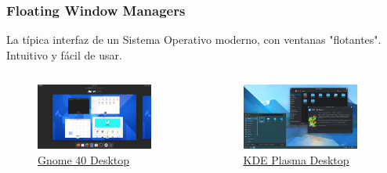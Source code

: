 \documentclass[aspectratio=43]{beamer}
\begin{document}
\begin{frame}
    \frametitle{Floating Window Managers}
    La típica interfaz de un Sistema Operativo moderno, con ventanas "flotantes". Intuitivo y fácil de usar.\newline

    \begin{columns}[c]
        \begin{column}{0.5\textwidth}
            \begin{figure}
                \centering
                \includegraphics[width=0.9\textwidth]{img/gnome-desktop.jpg}
                \caption{\href{https://forty.gnome.org/}{Gnome 40 Desktop}}
            \end{figure}
        \end{column}
        \begin{column}{0.5\textwidth}
            \begin{figure}
                \centering
                \includegraphics[width=0.9\textwidth]{img/kde_plasma.png}
                \caption{\href{https://kde.org/es/plasma-desktop/}{KDE Plasma Desktop}}
            \end{figure}
        \end{column}
    \end{columns}

\end{frame}
\end{document}
